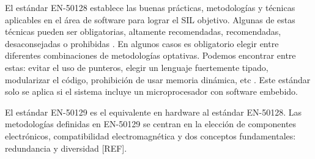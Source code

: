     \begin{table}[!h]
        {
        \caption{Asignación del SIL en función de la Probabilidad de Fallas por Hora (PFH).}
        \label{Tab:tabla_SIL}
        \centering
            \begin{center}
            \end{center}
        }    
    \end{table}

    El estándar EN-50128 establece las buenas prácticas, metodologías y técnicas aplicables en el área de software para lograr el SIL objetivo. Algunas de estas técnicas pueden ser obligatorias, altamente recomendadas, recomendadas, desaconsejadas o prohibidas \cite{Paper_70}. En algunos casos es obligatorio elegir entre diferentes combinaciones de metodologías optativas. Podemos encontrar entre estas: evitar el uso de punteros, elegir un lenguaje fuertemente tipado, modularizar el código, prohibición de usar memoria dinámica, etc \cite{Paper_70}. Este estándar solo se aplica si el sistema incluye un microprocesador con software embebido.

    El estándar EN-50129 es el equivalente en hardware al estándar EN-50128. Las metodologías definidas en EN-50129 se centran en la elección de componentes electrónicos, compatibilidad electromagnética y dos conceptos fundamentales: redundancia y diversidad [REF].

    